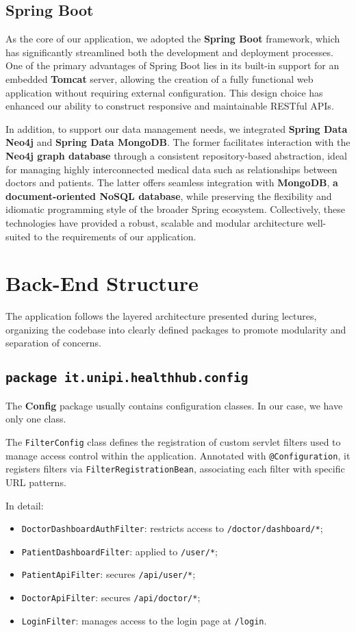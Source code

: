 \subsection{Spring Boot}
As the core of our application, we adopted the \textbf{Spring Boot} framework, which has significantly streamlined both the development and deployment processes. One of the primary advantages of Spring Boot lies in its built-in support for an embedded \textbf{Tomcat} server, allowing the creation of a fully functional web application without requiring external configuration. This design choice has enhanced our ability to construct responsive and maintainable RESTful APIs. 

In addition, to support our data management needs, we integrated \textbf{Spring Data Neo4j} and \textbf{Spring Data MongoDB}. The former facilitates interaction with the \textbf{Neo4j graph database} through a consistent repository-based abstraction, ideal for managing highly interconnected medical data such as relationships between doctors and patients. The latter offers seamless integration with \textbf{MongoDB}, \textbf{a document-oriented NoSQL database}, while preserving the flexibility and idiomatic programming style of the broader Spring ecosystem. Collectively, these technologies have provided a robust, scalable and modular architecture well-suited to the requirements of our application. 

\section{Back-End Structure}
The application follows the layered architecture presented during lectures, organizing the codebase into clearly defined packages to promote modularity and separation of concerns. 

\subsection{\texttt{package it.unipi.healthhub.config}}
The \textbf{Config} package usually contains configuration classes. In our case, we have only one class. 

The \texttt{FilterConfig} class defines the registration of custom servlet filters used to manage access control within the application. Annotated with \texttt{@Configuration}, it registers filters via \texttt{FilterRegistrationBean}, associating each filter with specific URL patterns. 

In detail:
\begin{itemize}
	\item \texttt{DoctorDashboardAuthFilter}: restricts access to \texttt{/doctor/dashboard/*};
	\item \texttt{PatientDashboardFilter}: applied to \texttt{/user/*};
	\item \texttt{PatientApiFilter}: secures \texttt{/api/user/*};
	\item \texttt{DoctorApiFilter}: secures \texttt{/api/doctor/*};
	\item \texttt{LoginFilter}: manages access to the login page at \texttt{/login}.
\end{itemize}

